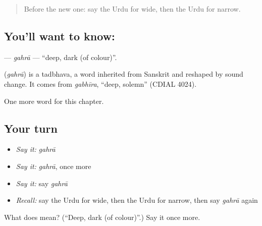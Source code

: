 \label{lesson:UR-C134-gahra}



\begin{quote}
Before the new one: say the Urdu for wide, then the Urdu for narrow.
\end{quote}

\subsection*{You'll want to know: }
\textbf{} — \emph{gahrā} — \textquotedblleft{}deep, dark (of colour)\textquotedblright{}.

\begin{cousinweb}
\textbf{} (\emph{gahrā}) is a tadbhava, a word inherited from Sanskrit and reshaped by sound change. It comes from \emph{gabhīra}, \textquotedblleft{}deep, solemn\textquotedblright{} (CDIAL 4024).
\end{cousinweb}

\begin{grammarlens}[title={What you've built}]
One more word for this chapter.
\end{grammarlens}

\subsection*{Your turn}
\begin{itemize}
\raggedright
  \item \emph{Say it:} \emph{gahrā}
  \item \emph{Say it:} \emph{gahrā}, once more
  \item \emph{Say it:} say \emph{gahrā}
  \item \emph{Recall:} say the Urdu for wide, then the Urdu for narrow, then say \emph{gahrā} again
\end{itemize}

\begin{tcolorbox}[breakable,colback=teal!4,colframe=teal!35!black,title={Before you move on}]
What does  mean? (\textquotedblleft{}Deep, dark (of colour)\textquotedblright{}.) Say it once more.
\end{tcolorbox}

